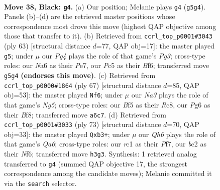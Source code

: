 \documentclass[11pt]{article}
\begin{document}
\clearpage

\begin{figure}[p]\centering
\begin{subfigure}{0.46\textwidth}\centering
\resizebox{\linewidth}{!}{%
\newchessgame
\chessboard[
  setfen={r5k1/pp6/n2Q2p1/2pP1bp1/8/P4PPq/1PB5/2RR2K1 b - - 2 38},
  showmover=false,
  pgfstyle=straightmove, color=movearrow, markmove={g5-g4}
]}
\caption{}
\end{subfigure}\hfill
\begin{subfigure}{0.46\textwidth}\centering
\resizebox{\linewidth}{!}{%
\newchessgame
\chessboard[
  setfen={3r2k1/p3pp1p/5bpP/1p1P4/5RPn/2q1Q1B1/5P2/4R1K1 b - - 1 32},
  showmover=false,
  pgfstyle=straightmove, color=movearrow, markmove={g6-g5}
]}
\caption{}
\end{subfigure}
\\[4pt]
\begin{subfigure}{0.46\textwidth}\centering
\resizebox{\linewidth}{!}{%
\newchessgame
\chessboard[
  setfen={2r2bk1/B4p2/3p2p1/3Pp2p/R1P1Q1n1/6Pq/4KP2/R7 b - - 1 34},
  showmover=false,
  pgfstyle=straightmove, color=movearrow, markmove={g4-f6}
]}
\caption{}
\end{subfigure}\hfill
\begin{subfigure}{0.46\textwidth}\centering
\resizebox{\linewidth}{!}{%
\newchessgame
\chessboard[
  setfen={r5k1/5pp1/4pn1p/1b6/3QPP2/qP4P1/3R2BP/1K1R4 b - - 2 37},
  showmover=false,
  pgfstyle=straightmove, color=movearrow, markmove={a3-b3}
]}
\caption{}
\end{subfigure}
\caption{\textbf{Move 38, Black: \texttt{g4}.} (a) Our position; Melanie plays \texttt{g4} (\texttt{g5g4}). Panels (b)--(d) are the retrieved master positions whose correspondence most drove this move (highest QAP objective among those that transfer to it). (b) Retrieved from \texttt{ccrl\_top\_p0001\#3043} (ply 63) [structural distance $d$=77, QAP obj=17]: the master played \texttt{g5}; under $\mu$ our \emph{Pg4} plays the role of that game's \emph{Pg3}; cross-type roles: our \emph{N}a6 as their \emph{P}e7, our \emph{P}c5 as their \emph{B}f6; transferred move \texttt{g5g4} \textbf{(endorses this move)}. (c) Retrieved from \texttt{ccrl\_top\_p0000\#1864} (ply 67) [structural distance $d$=85, QAP obj=53]: the master played \texttt{Nf6}; under $\mu$ our \emph{Na3} plays the role of that game's \emph{Ng5}; cross-type roles: our \emph{B}f5 as their \emph{R}c8, our \emph{P}g6 as their \emph{B}f8; transferred move \texttt{a6c7}. (d) Retrieved from \texttt{ccrl\_top\_p0001\#3033} (ply 73) [structural distance $d$=70, QAP obj=33]: the master played \texttt{Qxb3+}; under $\mu$ our \emph{Qh6} plays the role of that game's \emph{Qa6}; cross-type roles: our \emph{r}c1 as their \emph{P}f7, our \emph{b}c2 as their \emph{N}f6; transferred move \texttt{h3g3}. Synthesis: 1 retrieved analog transferred to \texttt{g4} (summed QAP objective 17, the strongest correspondence among the candidate moves); Melanie committed it via the \texttt{search} selector.}
\label{fig:thought-m75}
\end{figure}
\end{document}
